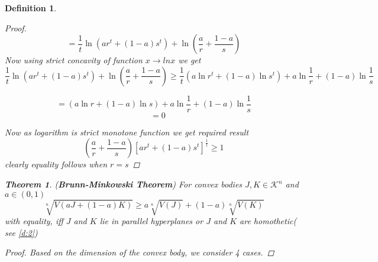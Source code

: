 \documentclass[oneside]{book}
\newtheorem{theorem}{Theorem}[section]
\newtheorem{mydef}{Definition}
\begin{document}
\begin{mydef}
\begin{proof}
$$ =\frac{1}{t} \ln \left(a r^{t}+(1-a) s^{t}\right)+\ln \left(\frac{a}{r}+\frac{1-a}{s}\right)$$
Now using strict concavity of  function  $x \rightarrow lnx $ we get 
$$\frac{1}{t} \ln \left(a r^{t}+(1-a) s^{t}\right)+\ln \left(\frac{a}{r}+\frac{1-a}{s}\right)
  \geq \frac{1}{t}\left(a \ln r^{t}+(1-a) \ln s^{t}\right)+a \ln \frac{1}{r}+(1-a) \ln \frac{1}{s}$$
  
  
$$ =  \left(a \ln r+(1-a) \ln s\right)+a \ln \frac{1}{r}+(1-a) \ln \frac{1}{s}$$
$$\quad = 0$$
 
 Now as logarithm is strict monotone function we get required result 
 \[
\left(\frac{a}{r}+\frac{1-a}{s}\right)\left[a r^{t}+(1-a) s^{t}\right]^{\frac{1}{t}} \geq 1
\]
 clearly equality follows when $r = s $
 \end{proof}
 
 
 
 
 
 
 
 
 
 \begin{theorem}(\textbf{Brunn-Minkowski Theorem})
 \label{t:11}
For convex bodies $J, K \in \mathcal{K}^{n}$ and $a \in(0,1)$
\begin{equation}
\label{eq54}
\sqrt[n]{V(a J+(1-a) K)} \geq a \sqrt[n]{V(J)}+(1-a) \sqrt[n]{V(K)}
\end{equation} \label{eq:4.19}
with equality, iff $J$ and $K$ lie in parallel hyperplanes or $J$ and $K$ are homothetic( see \ref{d:2})
  \end{theorem}
\begin{proof}
Based on the dimension of the convex body, we consider 4 cases.
 \hfill \break
 

\end{proof}
\end{mydef}
\end{document}
